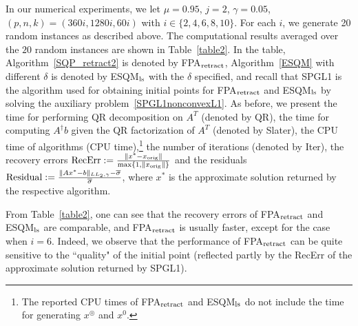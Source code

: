 \documentclass[10pt]{article}
\numberwithin{equation}{section}
\def\xorig{{x_{\rm orig}}}
\def\xfeasss{x^\circledcirc}
\begin{document}
In our numerical experiments, we let $\mu =0.95$, $j = 2$, $\gamma = 0.05$, {\color{black} $(p,n,k) = (360i,1280i,60i)$ }with $i\in \{2, 4, 6, 8, 10\}$. For each $i$, we generate {\color{black}20 random instances} as described above. The computational results averaged over the {\color{black} $20$ random instances} are shown in Table~\ref{table2}. In the table, Algorithm~\ref{SQP_retract2} is denoted by FPA$_{\rm retract}$, Algorithm~\ref{ESQM} with different $\delta$ is denoted by ESQM$_{\rm ls}$ with the $\delta$ specified, and recall that SPGL1 is the algorithm used for obtaining initial points for FPA$_{\rm retract}$ and ESQM$_{\rm ls}$ by solving the auxiliary problem~\eqref{SPGL1nonconvexL1}. As before, we present the time for performing QR decomposition on $A^T$ (denoted by QR), the time for computing $A^\dagger b$ given the QR factorization of $A^T$ (denoted by Slater), the CPU time of algorithms (CPU time),\footnote{The reported CPU times of FPA$_{\rm retract}$ and ESQM$_{\rm ls}$ do not include the time for generating $\xfeasss$ and $x^0$.} the number of iterations (denoted by Iter), the recovery errors $\text{RecErr} := \frac{\|x^* - \xorig\|}{\max\{1, \|\xorig\|\}}$ and the residuals ${\rm Residual} := \frac{\|Ax^* - b\|_{LL_2,\gamma} - \overline{\sigma} }{\overline{\sigma}}$, where $x^*$ is the approximate solution returned by the respective algorithm.

From Table~\ref{table2}, one can see that the recovery errors of FPA$_{\rm retract}$ and ESQM$_{\rm ls}$ are comparable, and FPA$_{\rm retract}$ is usually faster, except for the case when {\color{black}$i = 6$}.
Indeed, we observe that the performance of FPA$_{\rm retract}$ can be quite sensitive to the ``quality" of the initial point (reflected partly by the RecErr of the approximate solution returned by SPGL1).

\end{document}
